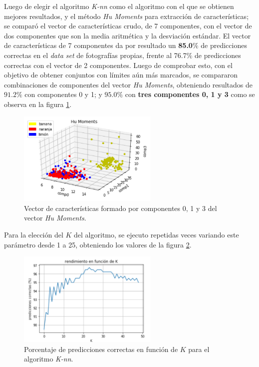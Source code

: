 \documentclass[10pt,a4paper]{article}
\begin{document}
Luego de elegir el algoritmo \textit{K-nn} como el algoritmo con el que se obtienen mejores resultados, y el método \textit{Hu Moments} para extracción de características; se comparó el vector de características crudo, de 7 componentes, con el vector de dos componentes que son la media aritmética y la desviación estándar. El vector de características de 7 componentes da por resultado un \textbf{85.0$\%$} de predicciones correctas en el \textit{data set} de fotografías propias, frente al 76.7$\%$ de predicciones correctas con el vector de 2 componentes. Luego de comprobar esto, con el objetivo de obtener conjuntos con límites aún más marcados, se compararon combinaciones de componentes del vector \textit{Hu Moments}, obteniendo resultados de $91.2\%$ con componentes 0 y 1; y $95.0\%$ con \textbf{tres componentes 0, 1 y 3} como se observa en la figura \ref{final-feature}.

\begin{figure}[h]
\centering
\includegraphics[width=0.6\textwidth]{imgs/final-feature.png}
\caption{Vector de características formado por componentes 0, 1 y 3 del vector \textit{Hu Moments}.}
\label{final-feature}
\end{figure}

Para la elección del $K$ del algoritmo, se ejecuto repetidas veces variando este parámetro desde 1 a 25, obteniendo los valores de la figura \ref{funcion-k}.

\begin{figure}[h]
\centering
\includegraphics[width=0.6\textwidth]{imgs/funcion-k.png}
\caption{Porcentaje de predicciones correctas en función de $K$ para el algoritmo \textit{K-nn}.}
\label{funcion-k}
\end{figure}
\end{document}
